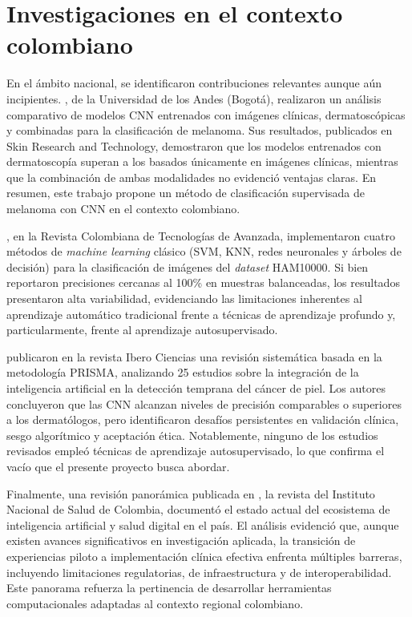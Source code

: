 \section{Investigaciones en el contexto colombiano}

 En el ámbito nacional, se identificaron contribuciones relevantes aunque aún incipientes. \textcite{riosduarte2024colombianmelanoma}, de la Universidad de los Andes (Bogotá), realizaron un análisis comparativo de modelos CNN entrenados con imágenes clínicas, dermatoscópicas y combinadas para la clasificación de melanoma. Sus resultados, publicados en Skin Research and Technology, demostraron que los modelos entrenados con dermatoscopía superan a los basados únicamente en imágenes clínicas, mientras que la combinación de ambas modalidades no evidenció ventajas claras. En resumen, este trabajo propone un método de clasificación supervisada de melanoma con CNN en el contexto colombiano.

\textcite{florez2022clasificaciondermatologica}, en la Revista Colombiana de Tecnologías de Avanzada, implementaron cuatro métodos de \textit{machine learning} clásico (SVM, KNN, redes neuronales y árboles de decisión) para la clasificación de imágenes del \textit{dataset} HAM10000. Si bien reportaron precisiones cercanas al 100\% en muestras balanceadas, los resultados presentaron alta variabilidad, evidenciando las limitaciones inherentes al aprendizaje automático tradicional frente a técnicas de aprendizaje profundo y, particularmente, frente al aprendizaje autosupervisado.

\textcite{torresospina2025iaprisma} publicaron en la revista Ibero Ciencias una revisión sistemática basada en la metodología PRISMA, analizando 25 estudios sobre la integración de la inteligencia artificial en la detección temprana del cáncer de piel. Los autores concluyeron que las CNN alcanzan niveles de precisión comparables o superiores a los dermatólogos, pero identificaron desafíos persistentes en validación clínica, sesgo algorítmico y aceptación ética. Notablemente, ninguno de los estudios revisados empleó técnicas de aprendizaje autosupervisado, lo que confirma el vacío que el presente proyecto busca abordar.

Finalmente, una revisión panorámica publicada en \textcite{biomedica2025iasaludcolombia}, la revista del Instituto Nacional de Salud de Colombia, documentó el estado actual del ecosistema de inteligencia artificial y salud digital en el país. El análisis evidenció que, aunque existen avances significativos en investigación aplicada, la transición de experiencias piloto a implementación clínica efectiva enfrenta múltiples barreras, incluyendo limitaciones regulatorias, de infraestructura y de interoperabilidad. Este panorama refuerza la pertinencia de desarrollar herramientas computacionales adaptadas al contexto regional colombiano.

